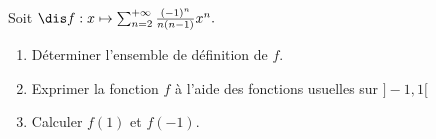 \documentclass[a4paper,10pt]{report}
\begin{document}
%

\begin{Exa} Soit $\dis f : x \mapsto \sum_{n = 2}^{ + \infty} \frac{( - 1)^{n}}{n(n - 1)}x^{n}.$

  \begin{enumerate}
  \item
    Déterminer l'ensemble de définition de $f$.
  \item
    Exprimer la fonction $f$ à l'aide des fonctions usuelles sur $] - 1,1[$
  \item Calculer $f(1)$ et $f( - 1)$.
  \end{enumerate}
  \end{Exa} 
  
\end{document}

